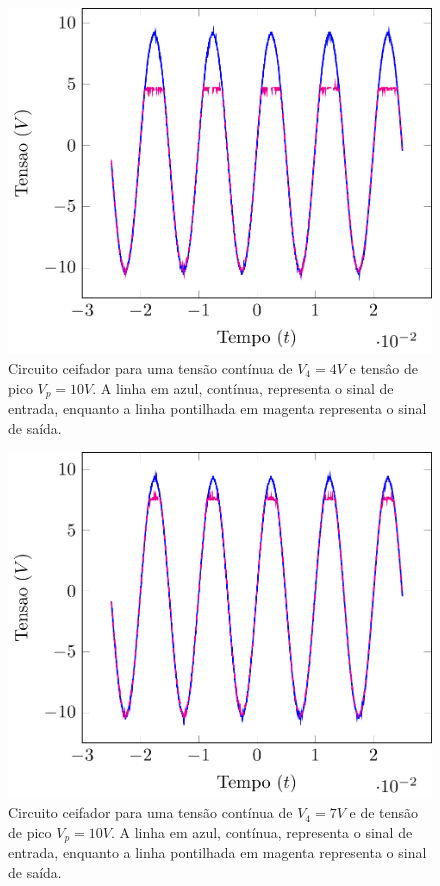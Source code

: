 \documentclass[12pt,a4paper]{article}
\begin{document}
\begin{figure}[htpb]
  \centering
  \includegraphics[width=0.8\linewidth]{./ceifador.pdf}
  \caption{Circuito ceifador para uma tensão contínua de $V_4=4V$ e tensâo de pico $V_{p}=10V$. A linha em azul, contínua, representa o sinal de entrada, enquanto a linha pontilhada em magenta representa o sinal de saída.}
  \label{fig:ceifador}
\end{figure}
\begin{figure}[htpb]
\centering
\includegraphics[width=0.8\linewidth]{./ceifador2.pdf}
\caption{Circuito ceifador para uma tensão contínua de $V_4=7V$ e de tensão de pico $V_{p}=10V$. A linha em azul, contínua, representa o sinal de entrada, enquanto a linha pontilhada em magenta representa o sinal de saída.}
\label{fig:ceifador2}
\end{figure}
\end{document}
